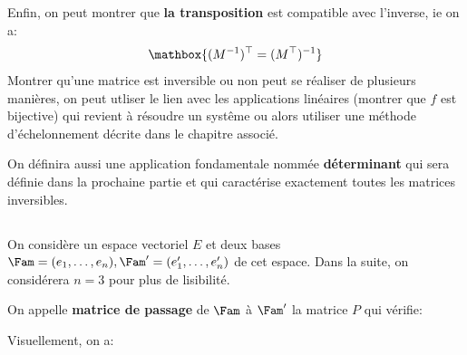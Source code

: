 Enfin, on peut montrer que \textbf{la transposition} est compatible avec l'inverse, ie on a:
\[
   \mathbox{(M^{-1})^{\top} = (M^{\top})^{-1}}   
\]
Montrer qu'une matrice est inversible ou non peut se réaliser de plusieurs manières, on peut utliser le lien avec les applications linéaires (montrer que \(f\) est bijective) qui revient à résoudre un systême ou alors utiliser une méthode d'échelonnement décrite dans le chapitre associé.\<

On définira aussi une application fondamentale nommée \textbf{déterminant} qui sera définie dans la prochaine partie et qui caractérise exactement toutes les matrices inversibles.

\subsection*{}
On considère un espace vectoriel \(E\) et deux bases \(\Fam=(e_1, \ldots, e_n), \Fam'=({e}_1', \ldots, {e}_n')\) de cet espace. Dans la suite, on considérera \(n = 3\) pour plus de lisibilité.\<

On appelle \textbf{matrice de passage} de \(\Fam\) à \(\Fam'\) la matrice \(P\) qui vérifie:
\begin{center}
\end{center}
Visuellement, on a:

